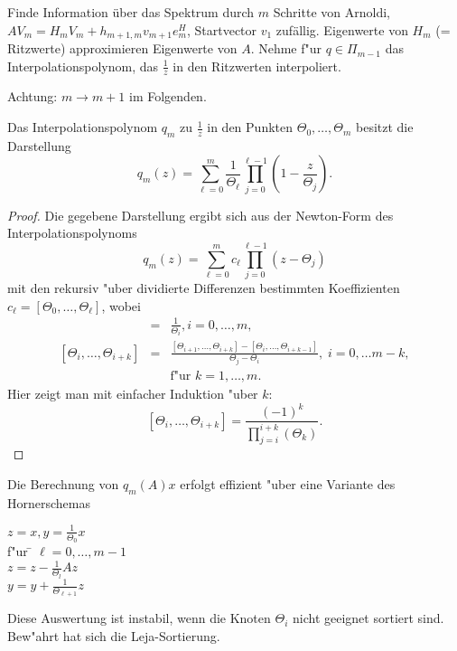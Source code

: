 \begin{bsp} Finde Information \"uber das Spektrum durch $m$ Schritte von Arnoldi, $AV_m = H_m V_m + h_{m+1,m}v_{m+1}e_m^H$, Startvector $v_1$ zuf\"allig.
Eigenwerte von $H_m$ (= Ritzwerte) approximieren Eigenwerte von $A$. Nehme f"ur $q \in \Pi_{m-1}$ das Interpolationspolynom, das $\frac{1}{z}$ in den Ritzwerten interpoliert.
\end{bsp}

Achtung: $m \to m+1$ im Folgenden.

\begin{lem}  Das Interpolationspolynom $q_{m}$ zu $\frac{1}{z}$ in den Punkten $\Theta_0,\ldots, \Theta_{m}$ besitzt die Darstellung
\[
q_{m}(z) = \sum_{\ell = 0}^{m} \frac{1}{\Theta_\ell} \prod_{j=0}^{\ell-1} \left(1-\frac{z}{\Theta_j} \right).
\]
\end{lem}
\begin{proof} Die gegebene Darstellung ergibt sich aus der Newton-Form des Interpolationspolynoms
\[
q_{m}(z) = \sum_{\ell = 0}^{m} c_\ell \prod_{j=0}^{\ell-1} \left( z-\Theta_j \right)
\]
mit den rekursiv "uber dividierte Differenzen bestimmten Koeffizienten $c_\ell = [\Theta_0,\ldots,\Theta_\ell]$, wobei
\begin{eqnarray*}
[\Theta_i,\Theta_i] &=& \frac{1}{\Theta_i}, i=0,\ldots,m, \\{}
[\Theta_i,\ldots,\Theta_{i+k}] &=& \frac{[\Theta_{i+1},\ldots,\Theta_{i+k}] - [\Theta_i,\ldots,\Theta_{i+k-1}]}{\Theta_j - \Theta_i}, \; i=0,\ldots m-k,\\
& & \text {f"ur $k=1,\ldots,m$.}
\end{eqnarray*}
Hier zeigt man mit einfacher Induktion "uber $k$:
\[
[\Theta_i,\ldots,\Theta_{i+k}] = \frac{(-1)^k}{\prod_{j=i}^{i+k}(\Theta_k)}.
\]
\end{proof}

Die Berechnung von $q_m(A)x$ erfolgt effizient "uber eine Variante des Hornerschemas
\begin{tabbing}
$z = x, y = \frac{1}{\Theta_0}x$ \\
f"ur \= $\ell = 0,\ldots,m-1$ \\
  \> $z = z-\frac{1}{\Theta_l}Az$ \\
  \> $y = y + \frac{1}{\Theta_{\ell+1}}z$
\end{tabbing}

Diese Auswertung ist instabil, wenn die Knoten $\Theta_i$ nicht geeignet sortiert sind. Bew"ahrt hat sich die Leja-Sortierung.


